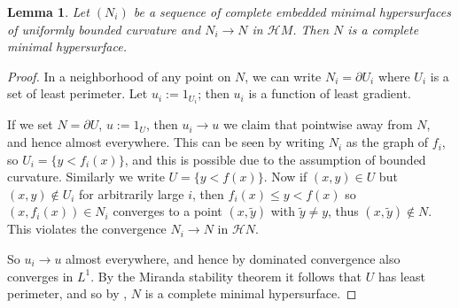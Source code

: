\documentclass[reqno,11pt]{amsart}
\newcommand{\Hypspace}{\mathscr H}
\newtheorem{lemma}[theorem]{Lemma}
\theoremstyle{definition}
\numberwithin{equation}{section}
\begin{document}
\begin{lemma}\label{limit of minimals is minimal}
Let $(N_i)$ be a sequence of complete embedded minimal hypersurfaces of uniformly bounded curvature and $N_i \to N$ in $\Hypspace M$.
Then $N$ is a complete minimal hypersurface.
\end{lemma}
\begin{proof}
In a neighborhood of any point on $N$, we can write $N_i = \partial U_i$ where $U_i$ is a set of least perimeter.
Let $u_i := 1_{U_i}$; then $u_i$ is a function of least gradient.

If we set $N = \partial U$, $u := 1_U$, then $u_i \to u$ we claim that pointwise away from $N$, and hence almost everywhere.
This can be seen by writing $N_i$ as the graph of $f_i$, so $U_i = \{y < f_i(x)\}$, and this is possible due to the assumption of bounded curvature.
Similarly we write $U = \{y < f(x)\}$.
Now if $(x, y) \in U$ but $(x, y) \notin U_i$ for arbitrarily large $i$, then $f_i(x) \leq y < f(x)$ so $(x, f_i(x)) \in N_i$ converges to a point $(x, \tilde y)$ with $\tilde y \neq y$, thus $(x, \tilde y) \notin N$.
This violates the convergence $N_i \to N$ in $\Hypspace N$.

So $u_i \to u$ almost everywhere, and hence by dominated convergence also converges in $L^1$.
By the Miranda stability theorem it follows that $U$ has least perimeter, and so by \cite{BackusFLG}, $N$ is a complete minimal hypersurface.
\end{proof}
\end{document}
